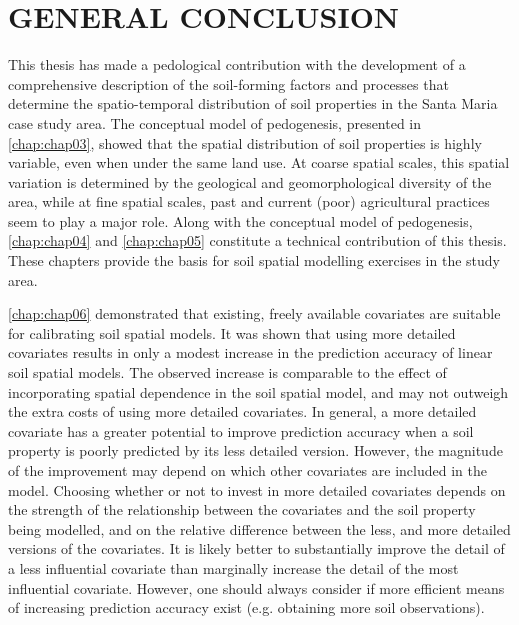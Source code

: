 \artigofalse
\chapter{GENERAL CONCLUSION}
\label{chap:chap10}

This thesis has made a pedological contribution with the development of a comprehensive description of the 
soil-forming factors and processes that determine the spatio-temporal distribution of soil properties in the 
Santa Maria case study area. The conceptual model of pedogenesis, presented in \autoref{chap:chap03}, showed 
that the spatial distribution of soil properties is highly variable, even when under the same land use. At 
coarse spatial scales, this spatial variation is determined by the geological and geomorphological diversity of 
the area, while at fine spatial scales, past and current (poor) agricultural practices seem to play a major 
role. Along with the conceptual model of pedogenesis, \autoref{chap:chap04} and \autoref{chap:chap05} 
constitute a technical contribution of this thesis. These chapters provide the basis for soil spatial modelling 
exercises in the study area.

\autoref{chap:chap06} demonstrated that existing, freely available covariates are suitable for calibrating soil 
spatial models. It was shown that using more detailed covariates results in only a modest increase in the 
prediction accuracy of linear soil spatial models. The observed increase is comparable to the effect of 
incorporating spatial dependence in the soil spatial model, and may not outweigh the extra costs of using more 
detailed covariates. In general, a more detailed covariate has a greater potential to improve 
prediction accuracy when a soil property is poorly predicted by its less detailed version. However, the 
magnitude of the improvement may depend on which other covariates are included in the model. Choosing whether 
or not to invest in more detailed covariates depends on the strength of the relationship between the covariates 
and the soil property being modelled, and on the relative difference between the less, and more detailed 
versions of the covariates. It is likely better to substantially improve the detail of a less influential 
covariate than marginally increase the detail of the most influential covariate. However, one should always 
consider if more efficient means of increasing prediction accuracy exist (e.g. obtaining more soil 
observations).

